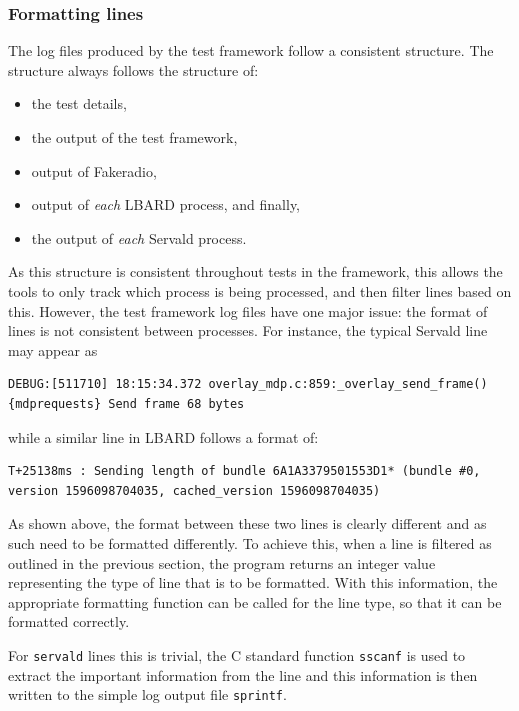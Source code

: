 \subsubsection{Formatting lines}
The log files produced by the test framework follow a consistent structure.
The structure always follows the structure of:
\begin{itemize}
    \item the test details, 
    \item the output of the test framework, 
    \item output of Fakeradio, 
    \item output of \emph{each} LBARD process, and finally,
    \item the output of \emph{each} Servald process.
\end{itemize} 

As this structure is consistent throughout tests in the framework, this allows the tools to only track which process is being processed, and then filter lines based on this.
However, the test framework log files have one major issue: the format of lines is not consistent between processes.
For instance, the typical Servald line may appear as
\begin{center}
    \begin{lstlisting}[basicstyle=\small, breaklines]
DEBUG:[511710] 18:15:34.372 overlay_mdp.c:859:_overlay_send_frame() {mdprequests} Send frame 68 bytes    
    \end{lstlisting}
\end{center}
while a similar line in LBARD follows a format of:
\begin{center}
    \begin{lstlisting}[basicstyle=\small, breaklines]
T+25138ms : Sending length of bundle 6A1A3379501553D1* (bundle #0, version 1596098704035, cached_version 1596098704035)
    \end{lstlisting}
\end{center}

As shown above, the format between these two lines is clearly different and as such need to be formatted differently.
To achieve this, when a line is filtered as outlined in the previous section, the program returns an integer value representing the type of line that is to be formatted.
With this information, the appropriate formatting function can be called for the line type, so that it can be formatted correctly.

For \texttt{servald} lines this is trivial, the C standard function \texttt{sscanf} is used to extract the important information from the line and this information is then written to the simple log output file \texttt{sprintf}.

